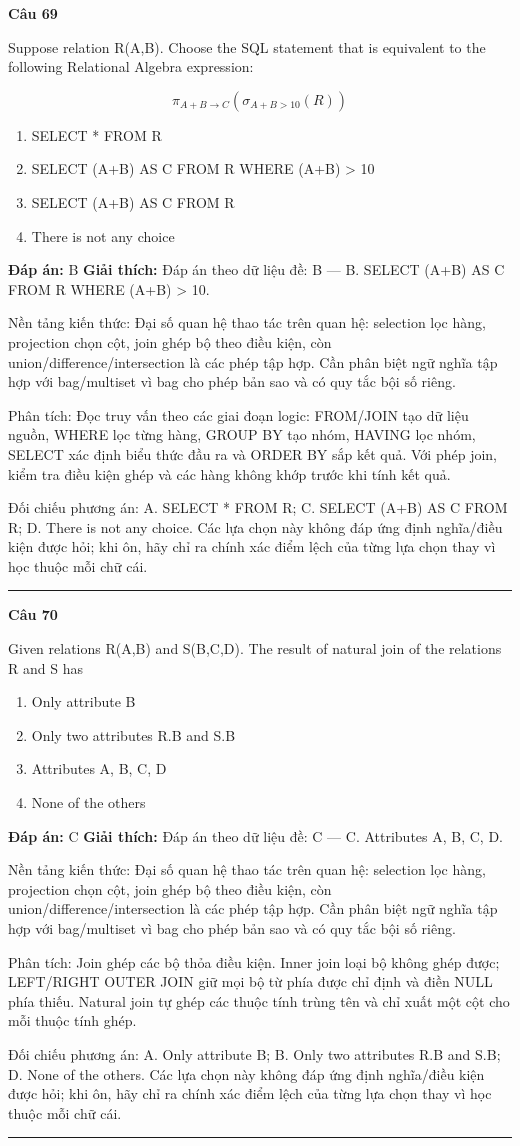 \documentclass[11pt,a4paper]{article}
\newenvironment{question}[1]{%
  \par\vspace{1em}\noindent\textbf{\large Câu #1}\par\vspace{0.4em}
}{%
  \par\vspace{1em}\hrule\vspace{0.6em}
}
\newenvironment{choices}{%
  \begin{enumerate}[label=\textbf{\Alph*.},leftmargin=2.2em,itemsep=2pt,topsep=3pt]
}{%
  \end{enumerate}
}
\newcommand{\choice}{\item}
\begin{document}
\begin{question}{69}
Suppose relation R(A,B).
Choose the SQL statement that is equivalent to the following Relational Algebra expression:

$$\pi_{A+B \rightarrow C}(\sigma_{A+B > 10}(R))$$
\begin{choices}
\choice SELECT *
FROM R
\choice SELECT (A+B) AS C
FROM R
WHERE (A+B) > 10
\choice SELECT (A+B) AS C
FROM R
\choice There is not any choice
\end{choices}
\textbf{Đáp án:} B
\textbf{Giải thích:} Đáp án theo dữ liệu đề: B — B. SELECT (A+B) AS C FROM R WHERE (A+B) > 10.

Nền tảng kiến thức: Đại số quan hệ thao tác trên quan hệ: selection lọc hàng, projection chọn cột, join ghép bộ theo điều kiện, còn union/difference/intersection là các phép tập hợp. Cần phân biệt ngữ nghĩa tập hợp với bag/multiset vì bag cho phép bản sao và có quy tắc bội số riêng.

Phân tích: Đọc truy vấn theo các giai đoạn logic: FROM/JOIN tạo dữ liệu nguồn, WHERE lọc từng hàng, GROUP BY tạo nhóm, HAVING lọc nhóm, SELECT xác định biểu thức đầu ra và ORDER BY sắp kết quả. Với phép join, kiểm tra điều kiện ghép và các hàng không khớp trước khi tính kết quả.

Đối chiếu phương án: A. SELECT * FROM R; C. SELECT (A+B) AS C FROM R; D. There is not any choice. Các lựa chọn này không đáp ứng định nghĩa/điều kiện được hỏi; khi ôn, hãy chỉ ra chính xác điểm lệch của từng lựa chọn thay vì học thuộc mỗi chữ cái.
\end{question}

\begin{question}{70}
Given relations R(A,B) and S(B,C,D). The result of natural join of the relations R and S has
\begin{choices}
\choice Only attribute B
\choice Only two attributes R.B and S.B
\choice Attributes A, B, C, D
\choice None of the others
\end{choices}
\textbf{Đáp án:} C
\textbf{Giải thích:} Đáp án theo dữ liệu đề: C — C. Attributes A, B, C, D.

Nền tảng kiến thức: Đại số quan hệ thao tác trên quan hệ: selection lọc hàng, projection chọn cột, join ghép bộ theo điều kiện, còn union/difference/intersection là các phép tập hợp. Cần phân biệt ngữ nghĩa tập hợp với bag/multiset vì bag cho phép bản sao và có quy tắc bội số riêng.

Phân tích: Join ghép các bộ thỏa điều kiện. Inner join loại bộ không ghép được; LEFT/RIGHT OUTER JOIN giữ mọi bộ từ phía được chỉ định và điền NULL phía thiếu. Natural join tự ghép các thuộc tính trùng tên và chỉ xuất một cột cho mỗi thuộc tính ghép.

Đối chiếu phương án: A. Only attribute B; B. Only two attributes R.B and S.B; D. None of the others. Các lựa chọn này không đáp ứng định nghĩa/điều kiện được hỏi; khi ôn, hãy chỉ ra chính xác điểm lệch của từng lựa chọn thay vì học thuộc mỗi chữ cái.
\end{question}
\end{document}
